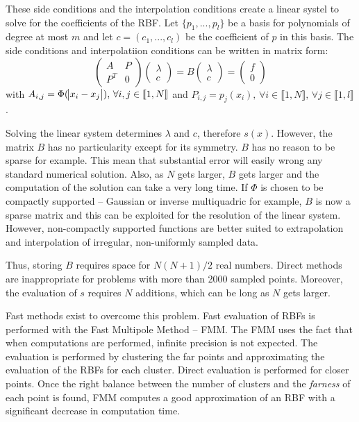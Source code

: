 \documentclass[a4paper]{article}
\begin{document}
These side conditions and the interpolation conditions create a linear systel to solve for the coefficients of the RBF. Let $\{p_1, ..., p_l\}$ be a basis for polynomials of degree at most $m$ and let $c = (c_1, ..., c_l)$ be the coefficient of $p$ in this basis. The side conditions and interpolatiion conditions can be written in matrix form:
$$
\begin{pmatrix}
A & P \\
P^T & 0
\end{pmatrix}
\begin{pmatrix}
\lambda \\
c
\end{pmatrix}
= B
\begin{pmatrix}
\lambda \\
c
\end{pmatrix}
=
\begin{pmatrix}
f \\
0
\end{pmatrix}
$$
with $A_{i,j} = \Phi(\abs{x_i - x_j})\text{, }\forall i,j \in \llbracket 1, N\rrbracket$ and $P_{i,j} = p_j(x_i)\text{, }\forall i \in \llbracket 1, N\rrbracket\text{, }\forall j \in \llbracket 1, l\rrbracket$.

Solving the linear system determines $\lambda$ and $c$, therefore $s(x)$. However, the matrix $B$ has no particularity except for its symmetry. $B$ has no reason to be sparse for example. This mean that substantial error will easily wrong any standard numerical solution. Also, as $N$ gets larger, $B$ gets larger and the computation of the solution can take a very long time. If $\Phi$ is chosen to be compactly supported -- Gaussian or inverse multiquadric for example, $B$ is now a sparse matrix and this can be exploited for the resolution of the linear system. However, non-compactly supported functions are better suited to extrapolation and interpolation of irregular, non-uniformly sampled data.

Thus, storing $B$ requires space for $N(N+1)/2$ real numbers. Direct methods are inappropriate for problems with more than 2000 sampled points. Moreover, the evaluation of $s$ requires $N$ additions, which can be long as $N$ gets larger.

Fast methods exist to overcome this problem. Fast evaluation of RBFs is performed with the Fast Multipole Method -- FMM. The FMM uses the fact that when computations are performed, infinite precision is not expected. The evaluation is performed by clustering the far points and approximating the evaluation of the RBFs for each cluster. Direct evaluation is performed for closer points. Once the right balance between the number of clusters and the \emph{farness} of each point is found, FMM computes a good approximation of an RBF with a significant decrease in computation time.
\end{document}
